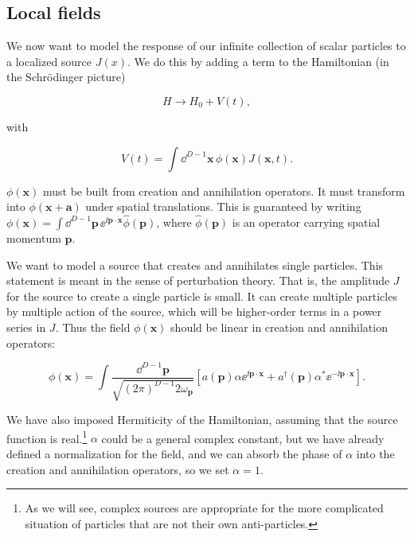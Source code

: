 \subsection{Local fields}

We now want to model the response of our infinite collection of scalar particles to
a localized source $J(x)$. We do this by adding a term to the Hamiltonian (in the
Schrödinger picture)

\begin{equation}
H\to H_0+V(t),
\label{eq:2.6}
\end{equation}

with

\begin{equation}
V(t)=\int\dd^{D-1}\mathbf x\,\phi(\mathbf x)J(\mathbf x,t).
\label{eq:2.7}
\end{equation}

$\phi(\mathbf x)$ must be built from creation and annihilation operators. It must transform into
$\phi(\mathbf x+\mathbf a)$ under spatial translations. This is guaranteed by writing $\phi(\mathbf x)=\int\dd^{D-1}\mathbf p\,\ee^{\ii\mathbf p\mathbin{\cdot}\mathbf x}\hat\phi(\mathbf p)$,
where $\hat\phi(\mathbf p)$ is an operator carrying spatial momentum $\mathbf p$.

We want to model a source that creates and annihilates single particles. This statement
is meant in the sense of perturbation theory. That is, the amplitude $J$ for the source to
create a single particle is small. It can create multiple particles by multiple action of
the source, which will be higher-order terms in a power series in $J$. Thus the field $\phi(\mathbf x)$
should be linear in creation and annihilation operators:

\begin{equation}
\phi(\mathbf x)=\int\frac{\dd^{D-1}\mathbf p}{\sqrt{(2\pi)^{D-1} 2\omega_{\mathbf p}}}\left[a(\mathbf p)\alpha\ee^{\ii\mathbf p\mathbin{\cdot}\mathbf x}+a^\dagger(\mathbf p)\alpha^*\ee^{-\ii\mathbf p\mathbin{\cdot}\mathbf x}\right].
\label{eq:2.8}
\end{equation}

We have also imposed Hermiticity of the Hamiltonian, assuming that the source function
is real.\footnote[3]{As we will see, complex sources are appropriate for the more complicated situation of particles that are not their own anti-particles.} $\alpha$ could be a general complex constant, but we have already defined a
normalization for the field, and we can absorb the phase of $\alpha$ into the creation and
annihilation operators, so we set $\alpha=1$.

